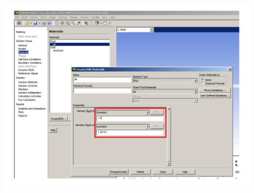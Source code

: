 \documentclass[10pt,compress, unknownkeysallowed]{beamer}
\begin{document}
\begin{frame}
\begin{columns}
\begin{column}[l]{0.5\linewidth}
{\begin{center}
                   \includegraphics[width=\columnwidth, clip]{./Figs/ProblemSetup3.pdf}
               \end{center}}
           \end{column}
    \end{columns}
\end{frame}
\end{document}
